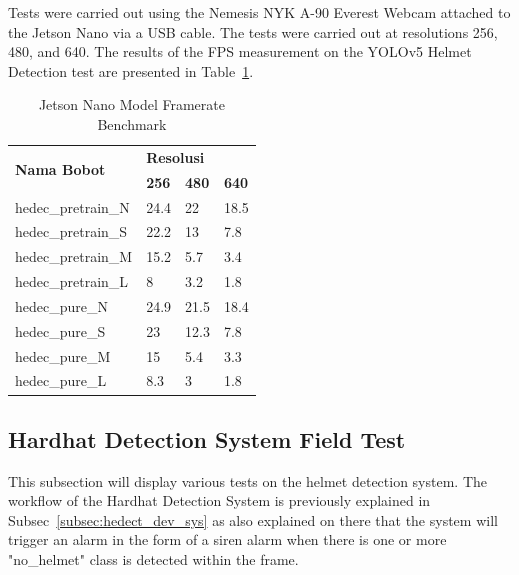  
\par Tests were carried out using the Nemesis NYK A-90 Everest Webcam attached to the Jetson Nano via a USB cable. The tests were carried out at resolutions 256, 480, and 640. The results of the FPS measurement on the YOLOv5 Helmet Detection test are presented in Table~\ref{tb:jetsonano_model_benchmark}.

\begin{table}
  \centering
  \caption{Jetson Nano Model Framerate Benchmark}
  \label{tb:jetsonano_model_benchmark}
  \begin{tabular}{|l|l|l|l|} 
    \hline
    \multirow{2}{*}{\textbf{Nama Bobot}} & \multicolumn{3}{l|}{\textbf{Resolusi}}      \\ 
    \cline{2-4}
                                         & \textbf{256} & \textbf{480} & \textbf{640}  \\ 
    \hline
    hedec\_pretrain\_N                   & 24.4         & 22           & 18.5          \\
    hedec\_pretrain\_S                   & 22.2         & 13           & 7.8           \\
    hedec\_pretrain\_M                   & 15.2         & 5.7          & 3.4           \\
    hedec\_pretrain\_L                   & 8            & 3.2          & 1.8           \\
    hedec\_pure\_N                       & 24.9         & 21.5         & 18.4          \\
    hedec\_pure\_S                       & 23           & 12.3         & 7.8           \\
    hedec\_pure\_M                       & 15           & 5.4          & 3.3           \\
    hedec\_pure\_L                       & 8.3          & 3            & 1.8           \\
    \hline
  \end{tabular}
\end{table}


\subsection{Hardhat Detection System Field Test}
\label{subsec:hedect_sys_test}

\par This subsection will display various tests on the helmet detection system. The workflow of the Hardhat Detection System is previously explained in Subsec~\ref{subsec:hedect_dev_sys} as also explained on there that the system will trigger an alarm in the form of a siren alarm when there is one or more "no\_helmet" class is detected within the frame. 

